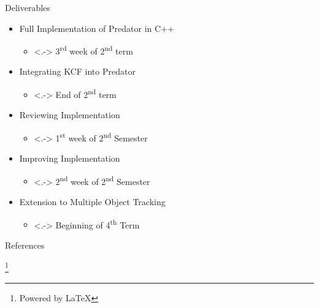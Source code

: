 \documentclass[mathserif]{beamer}
\newcommand\blfootnote[1]{
  \begingroup
  \renewcommand\thefootnote{}\footnote{#1}
  \addtocounter{footnote}{-1}
  \endgroup
}
\begin{document}
\begin{frame}[label=deliverables]{Deliverables}
  \begin{itemize}[<+->]
    \setlength\itemsep{.5em}
     \item \hspace{0pt}
        \pause Full Implementation of Predator in C++
          \begin{itemize}
            \item<.-> 3\textsuperscript{rd} week of 2\textsuperscript{nd} term
          \end{itemize}
      \pause \item Integrating KCF into Predator
          \begin{itemize}
            \item<.-> End of 2\textsuperscript{nd} term
          \end{itemize}
        \pause \item Reviewing Implementation
          \begin{itemize}
             \item<.-> 1\textsuperscript{st} week of 2\textsuperscript{nd} Semester
          \end{itemize}
            \pause \item Improving Implementation
          \begin{itemize}
            \item<.-> 2\textsuperscript{nd} week of 2\textsuperscript{nd} Semester
          \end{itemize}
            \pause \item Extension to Multiple Object Tracking
          \begin{itemize}
             \item<.-> Beginning of 4\textsuperscript{th} Term
          \end{itemize}
  \end{itemize}

\end{frame}

\begin{frame}{References}
    \printbibliography
    \blfootnote{Powered by \LaTeX}
\end{frame}
\end{document}
